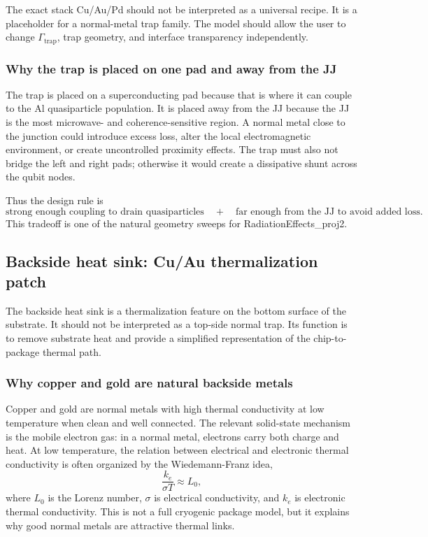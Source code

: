 \documentclass[11pt]{article}
\begin{document}
The exact stack Cu/Au/Pd should not be interpreted as a universal recipe. It is a placeholder for a normal-metal trap family. The model should allow the user to change $\Gamma_{\mathrm{trap}}$, trap geometry, and interface transparency independently.

\subsubsection{Why the trap is placed on one pad and away from the JJ}
The trap is placed on a superconducting pad because that is where it can couple to the Al quasiparticle population. It is placed away from the JJ because the JJ is the most microwave- and coherence-sensitive region. A normal metal close to the junction could introduce excess loss, alter the local electromagnetic environment, or create uncontrolled proximity effects. The trap must also not bridge the left and right pads; otherwise it would create a dissipative shunt across the qubit nodes.

Thus the design rule is
\begin{equation}
    \text{strong enough coupling to drain quasiparticles}
    \quad + \quad
    \text{far enough from the JJ to avoid added loss}.
\end{equation}
This tradeoff is one of the natural geometry sweeps for RadiationEffects\_proj2.

\subsection{Backside heat sink: Cu/Au thermalization patch}
The backside heat sink is a thermalization feature on the bottom surface of the substrate. It should not be interpreted as a top-side normal trap. Its function is to remove substrate heat and provide a simplified representation of the chip-to-package thermal path.

\subsubsection{Why copper and gold are natural backside metals}
Copper and gold are normal metals with high thermal conductivity at low temperature when clean and well connected. The relevant solid-state mechanism is the mobile electron gas: in a normal metal, electrons carry both charge and heat. At low temperature, the relation between electrical and electronic thermal conductivity is often organized by the Wiedemann-Franz idea,
\begin{equation}
    \frac{k_e}{\sigma T} \approx L_0,
\end{equation}
where $L_0$ is the Lorenz number, $\sigma$ is electrical conductivity, and $k_e$ is electronic thermal conductivity. This is not a full cryogenic package model, but it explains why good normal metals are attractive thermal links.
\end{document}
